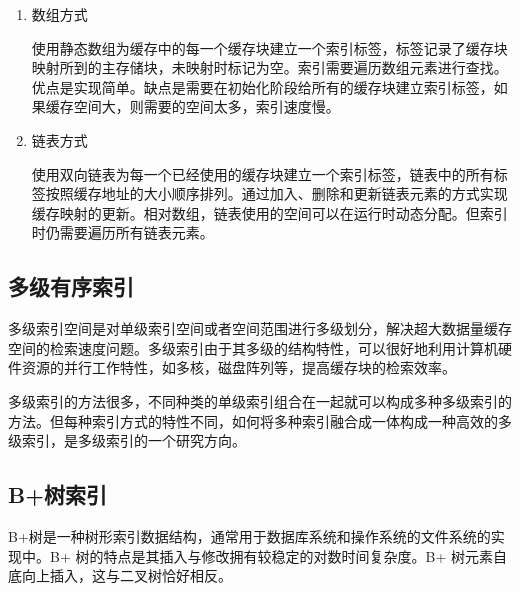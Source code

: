 \begin{enumerate}
\item 数组方式

使用静态数组为缓存中的每一个缓存块建立一个索引标签，标签记录了缓存块映射所到的主存储块，未映射时标记为空。索引需要遍历数组元素进行查找。优点是实现简单。缺点是需要在初始化阶段给所有的缓存块建立索引标签，如果缓存空间大，则需要的空间太多，索引速度慢。
\item 链表方式

使用双向链表为每一个已经使用的缓存块建立一个索引标签，链表中的所有标签按照缓存地址的大小顺序排列。通过加入、删除和更新链表元素的方式实现缓存映射的更新。相对数组，链表使用的空间可以在运行时动态分配。但索引时仍需要遍历所有链表元素。
\end{enumerate}

\subsection{多级有序索引}

多级索引空间是对单级索引空间或者空间范围进行多级划分，解决超大数据量缓存空间的检索速度问题。多级索引由于其多级的结构特性，可以很好地利用计算机硬件资源的并行工作特性，如多核，磁盘阵列等，提高缓存块的检索效率。

多级索引的方法很多，不同种类的单级索引组合在一起就可以构成多种多级索引的方法。但每种索引方式的特性不同，如何将多种索引融合成一体构成一种高效的多级索引，是多级索引的一个研究方向。

\subsection{B+树索引}
B+树是一种树形索引数据结构，通常用于数据库系统和操作系统的文件系统的实现中。B+ 树的特点是其插入与修改拥有较稳定的对数时间复杂度。B+ 树元素自底向上插入，这与二叉树恰好相反。

